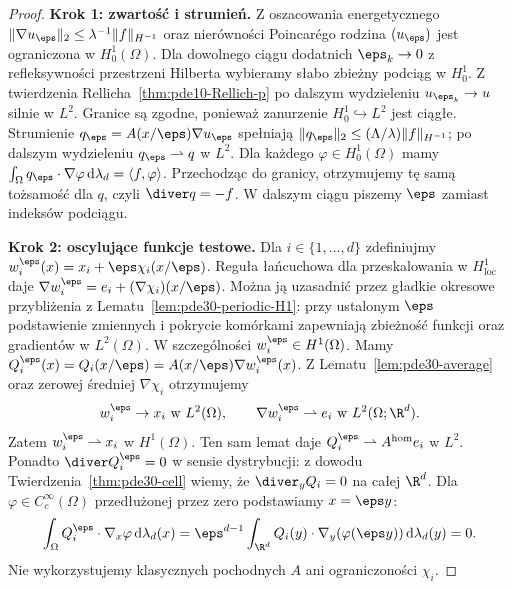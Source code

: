 \begin{proof}
\textbf{Krok 1: zwartość i strumień.}
Z oszacowania energetycznego
$\|\nabla u_\eps\|_2\le\lambda^{-1}\|f\|_{H^{-1}}$
oraz nierówności Poincarégo rodzina $(u_\eps)$
jest ograniczona w $H_0^1(\Omega)$.
Dla dowolnego ciągu dodatnich $\eps_k\to0$
z refleksywności przestrzeni Hilberta wybieramy
słabo zbieżny podciąg w $H_0^1$.
Z twierdzenia Rellicha~\ref{thm:pde10-Rellich-p}
po dalszym wydzieleniu $u_{\eps_k}\to u$ silnie
w $L^2$. Granice są zgodne, ponieważ zanurzenie
$H_0^1\hookrightarrow L^2$ jest ciągłe.
Strumienie $q_\eps=A(x/\eps)\nabla u_\eps$ spełniają
$\|q_\eps\|_2\le(\Lambda/\lambda)\|f\|_{H^{-1}}$;
po dalszym wydzieleniu $q_\eps\rightharpoonup q$ w $L^2$.
Dla każdego $\varphi\in H_0^1(\Omega)$
mamy $\int_\Omega q_\eps\cdot\nabla\varphi\,
\mathrm d\lambda_d=\langle f,\varphi\rangle$.
Przechodząc do granicy, otrzymujemy tę samą
tożsamość dla $q$, czyli $\diver q=-f$.
W dalszym ciągu piszemy $\eps$ zamiast indeksów podciągu.

\textbf{Krok 2: oscylujące funkcje testowe.}
Dla $i\in\{1,\ldots,d\}$ zdefiniujmy
$w_i^\eps(x)=x_i+\eps\chi_i(x/\eps)$.
Reguła łańcuchowa dla przeskalowania w $H^1_{\mathrm{loc}}$
daje $\nabla w_i^\eps=e_i+(\nabla\chi_i)(x/\eps)$.
Można ją uzasadnić przez gładkie okresowe przybliżenia
z Lematu~\ref{lem:pde30-periodic-H1}: przy ustalonym
$\eps$ podstawienie zmiennych i pokrycie komórkami
zapewniają zbieżność funkcji oraz gradientów w $L^2(\Omega)$.
W szczególności $w_i^\eps\in H^1(\Omega)$.
Mamy
$Q_i^\eps(x)=Q_i(x/\eps)=A(x/\eps)\nabla w_i^\eps(x)$.
Z Lematu~\ref{lem:pde30-average} oraz zerowej średniej
$\nabla\chi_i$ otrzymujemy
\[
 w_i^\eps\to x_i\ \text{w }L^2(\Omega),
 \qquad \nabla w_i^\eps\rightharpoonup e_i\
 \text{w }L^2(\Omega;\R^d).
\]
Zatem $w_i^\eps\rightharpoonup x_i$ w $H^1(\Omega)$.
Ten sam lemat daje
$Q_i^\eps\rightharpoonup A^{\mathrm{hom}}e_i$ w $L^2$.
Ponadto $\diver Q_i^\eps=0$ w sensie dystrybucji:
z dowodu Twierdzenia~\ref{thm:pde30-cell} wiemy,
że $\diver_yQ_i=0$ na całej $\R^d$.
Dla $\varphi\in C_c^\infty(\Omega)$ przedłużonej
przez zero podstawiamy $x=\eps y$:
\[
 \int_\Omega Q_i^\eps\cdot\nabla_x\varphi\,
 \mathrm d\lambda_d(x)
 =\eps^{d-1}\int_{\R^d} Q_i(y)\cdot
 \nabla_y(\varphi(\eps y))\,\mathrm d\lambda_d(y)=0.
\]
Nie wykorzystujemy klasycznych pochodnych $A$
ani ograniczoności $\chi_i$.


\end{proof}
